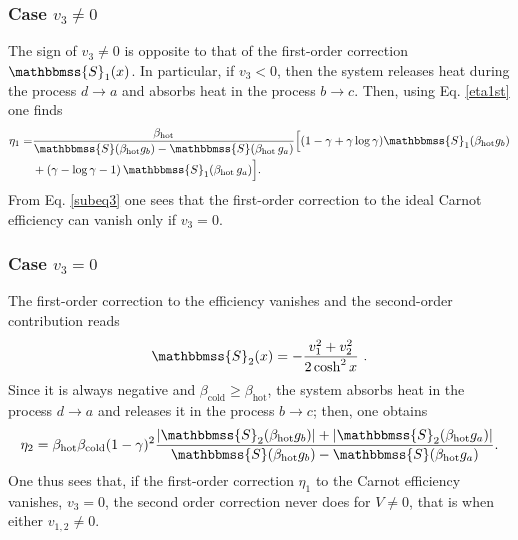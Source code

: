 \documentclass[aps,pra,floatfix,twocolumn,groupedaddress,superscriptaddress,nofootinbib,notitlepage,amsmath,amssymb,]{revtex4-1}
\begin{document}
\subsubsection{Case $v_3\ne 0$}

The sign of $v_3\neq 0$ is opposite to that of the first-order correction $\mathbbmss{S}_1(x)$. In particular, if $v_3 <0$, then the system releases heat during the process $d\to a$ and absorbs heat in the process $b\to c$. Then, using Eq. \eqref{eta1st} one finds 
\begin{align}
\eta_1 =& \frac{\beta_{\mathrm{hot}}}{\mathbbmss{S}(\beta_{\mathrm{hot}}g_b)- \mathbbmss{S}(\beta_{\mathrm{hot}}\,g_a)}\Big[(1-\gamma+\gamma \log \gamma) \mathbbmss{S}_1(\beta_{\mathrm{hot}}g_b)\nonumber\\ 
\label{1qeta1}
&+ (\gamma-\log \gamma-1)\, \mathbbmss{S}_1(\beta_{\mathrm{hot}}\,g_a)\Big].
\end{align}
From Eq. \eqref{subeq3} one sees that the first-order correction to the ideal Carnot efficiency can vanish only if $v_3=0$.

\subsubsection{Case $v_3 = 0$}

The first-order correction to the efficiency vanishes and the second-order contribution reads
\begin{equation}
\label{1qent2}
\mathbbmss{S}_2(x)= -\frac{v_1^2+v_2^2}{2\cosh^2 x}\ .
\end{equation}
Since it is always negative and $\beta_{\mathrm{cold}}\geqslant\beta_{\mathrm{hot}}$, the system absorbs heat in the process $d\to a$ and releases it in the process $b\to c$; then, one obtains
\begin{equation}
\label{1qeta2}
\eta_2 = \beta_{\mathrm{hot}} \beta_{\mathrm{cold}} (1-\gamma)^2\frac{\left|\mathbbmss{S}_2(\beta_{\mathrm{hot}}g_b)\right|+\left|\mathbbmss{S}_2(\beta_{\mathrm{hot}}g_a)\right|}{\mathbbmss{S}(\beta_{\mathrm{hot}}g_b)- \mathbbmss{S}(\beta_{\mathrm{hot}}g_a)}.
\end{equation}
One thus sees that, if the first-order correction $\eta_1$ to the Carnot efficiency vanishes, $v_3=0$, the second order correction never does for $V\neq 0$, that is when either $v_{1,2}\neq 0$.

\end{document}
